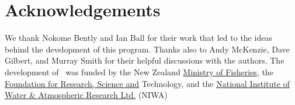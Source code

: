 \section{Acknowledgements\label{sec:acknowledgements}}

We thank Nokome Bently and Ian Ball for their work that led to the ideas behind the development of this program. Thanks also to Andy McKenzie, Dave Gilbert, and Murray Smith for their helpful discussions with the authors. The development of \SPM\ was funded by the New Zealand \href{http://www.fish.govt.nz}{Ministry of Fisheries}, the \href{http://www.frst.govt.nz/}{Foundation for Research, Science and} Technology, and the \href{http://www.niwa.co.nz}{National Institute of Water \& Atmospheric Research Ltd.} (NIWA)
